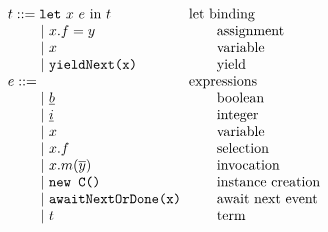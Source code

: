 \documentclass{acm_proc_article-sp}
\newcommand{\gap}{\quad\quad}
\newcommand{\ba}{\begin{array}}
\newcommand{\ea}{\end{array}}
\newcommand{\seq}[1]{\overline{#1}}
\begin{document}
\begin{figure}
  \centering
$\ba[t]{l@{\hspace{2mm}}l}
t    ::=  \texttt{let}~x~e~\mbox{in}~t                   & \mbox{let binding}      \\
\gap ~|~ x.f = y                                         & \gap\mbox{assignment}   \\
\gap ~|~ x                                               & \gap\mbox{variable}     \\
\gap ~|~ \texttt{yieldNext(x)}                           & \gap\mbox{yield}        \\
e    ::=                                                 & \mbox{expressions}      \\
\gap ~|~ \uline{b}                                       & \gap\mbox{boolean}      \\
\gap ~|~ \uline{i}                                       & \gap\mbox{integer}      \\
\gap ~|~ x                                               & \gap\mbox{variable}     \\
\gap ~|~ x.f                                             & \gap\mbox{selection}    \\
\gap ~|~ x.m(\seq{y})                                    & \gap\mbox{invocation}   \\
\gap ~|~ \texttt{new C()}                                & \gap\mbox{instance creation}   \\
\gap ~|~ \texttt{awaitNextOrDone(x)}                     & \gap\mbox{await next event}   \\
\gap ~|~ t                                               & \gap\mbox{term}         \\
\ea$
  \caption{}
  \label{fig:lang-syntax-2}
\end{figure}
\end{document}
